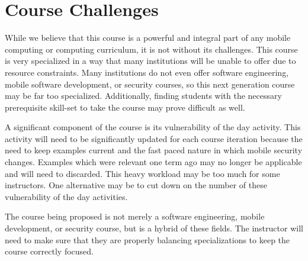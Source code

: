\documentclass{sig-alternate}
\begin{document}
\section{Course Challenges}
\label{sec: coursechallenges}


While we believe that this course is a powerful and integral part of any mobile computing or computing curriculum, it is not without its challenges. This course is very specialized in a way that many institutions will be unable to offer due to resource constraints. Many institutions do not even offer software engineering, mobile software development, or security courses, so this next generation course may be far too specialized. Additionally, finding students with the necessary prerequisite skill-set to take the course may prove difficult as well.

A significant component of the course is its vulnerability of the day activity. This activity will need to be significantly updated for each course iteration because the need to keep examples current and the fast paced nature in which mobile security changes. Examples which were relevant one term ago may no longer be applicable and will need to discarded. This heavy workload may be too much for some instructors. One alternative may be to cut down on the number of these vulnerability of the day activities.

The course being proposed is not merely a software engineering, mobile development, or security course, but is a hybrid of these fields. The instructor will need to make sure that they are properly balancing specializations to keep the course correctly focused.







\end{document}
